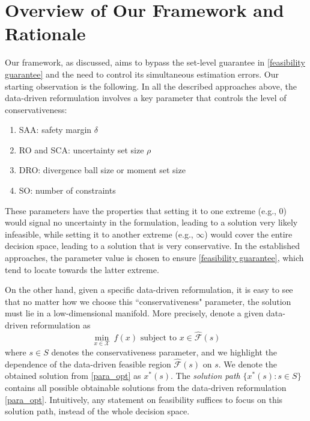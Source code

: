 \documentclass[mnsc,blindrev]{informs4} %
\begin{document}
\section{Overview of Our Framework and Rationale}\label{sec:overview}
%
Our framework, as discussed, aims to bypass the set-level guarantee in \eqref{feasibility guarantee} and the need to control its simultaneous estimation errors. Our starting observation is the following. In all the described approaches above, the data-driven reformulation involves a key parameter that controls the level of conservativeness:
\begin{enumerate}
\item SAA: safety margin $\delta$
\item RO and SCA: uncertainty set size $\rho$
\item DRO: divergence ball size or moment set size
\item SO: number of constraints
\end{enumerate}
These parameters have the properties that setting it to one extreme (e.g., 0) would signal no uncertainty in the formulation, leading to a solution very likely infeasible, while setting it to another extreme (e.g., $\infty$) would cover the entire decision space, leading to a solution that is very conservative. In the established approaches, the parameter value is chosen to ensure \eqref{feasibility guarantee}, which tend to locate towards the latter extreme.


On the other hand, given a specific data-driven reformulation, it is easy to see that no matter how we choose this ``conservativeness" parameter, the solution must lie in a low-dimensional manifold. More precisely, denote a given data-driven reformulation as
\begin{equation}\label{para_opt}
\min_{x\in\mathcal X}\ f(x)\text{\ \ subject to\ \ }x\in\hat{\mathcal F}(s)
\end{equation}
where $s\in S$ denotes the conservativeness parameter, and we highlight the dependence of the data-driven feasible region $\hat{\mathcal F}(s)$ on $s$. We denote the obtained solution from \eqref{para_opt} as $x^*(s)$. The \emph{solution path} $\{x^*(s):s\in S\}$ contains all possible obtainable solutions from the data-driven reformulation \eqref{para_opt}. Intuitively, any statement on feasibility suffices to focus on this solution path, instead of the whole decision space.
\end{document}
